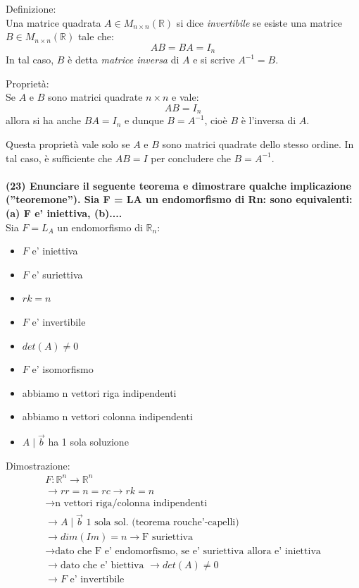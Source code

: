 \documentclass[10pt]{extarticle}
\begin{document}
Definizione:\\
Una matrice quadrata $A \in M_{n \times n}(\mathbb{R})$ si dice \textit{invertibile} se esiste una matrice $B \in M_{n \times n}(\mathbb{R})$ tale che:
\[
AB = BA = I_n
\]
In tal caso, $B$ è detta \textit{matrice inversa} di $A$ e si scrive $A^{-1} = B$.

Proprietà:\\
Se $A$ e $B$ sono matrici quadrate $n \times n$ e vale:
\[
AB = I_n
\]
allora si ha anche $BA = I_n$ e dunque $B = A^{-1}$, cioè $B$ è l’inversa di $A$.

Questa proprietà vale solo se $A$ e $B$ sono matrici quadrate dello stesso ordine. In tal caso, è sufficiente che $AB = I$ per concludere che $B = A^{-1}$. \\
\vspace{1em} \\
\textbf{(23) Enunciare il seguente teorema e dimostrare qualche implicazione (”teoremone”). Sia F =
LA un endomorfismo di Rn: sono equivalenti:(a) F e' iniettiva, (b)....}\\
Sia $F = L_A$ un endomorfismo di $\mathbb{R}_n$: 
\begin{itemize}
    \item $F$ e' iniettiva 
    \item $F$ e' suriettiva 
    \item $rk=n$ 
    \item $F$ e' invertibile 
    \item $det(A)\neq0$
    \item $F$ e' isomorfismo 
    \item abbiamo n vettori riga indipendenti 
    \item abbiamo n vettori colonna indipendenti 
    \item $A \mid \vec{b}$ ha 1 sola soluzione 
\end{itemize}
Dimostrazione:
\begin{align*}
    F : \mathbb{R}^n \to \mathbb{R}^n \\
    \to rr=n=rc \to rk=n \\
    \to \text{n vettori riga/colonna indipendenti} \\
    \to A\mid \vec{b} \text{ 1 sola sol. (teorema rouche'-capelli)} \\
    \to dim(Im)=n \to \text{F suriettiva} \\
    \to \text{dato che F e' endomorfismo, se e' suriettiva allora e' iniettiva} \\
    \to \text{dato che e' biettiva } \to det(A)\neq0 \\
    \to F \text{ e' invertibile}
\end{align*}
\end{document}

